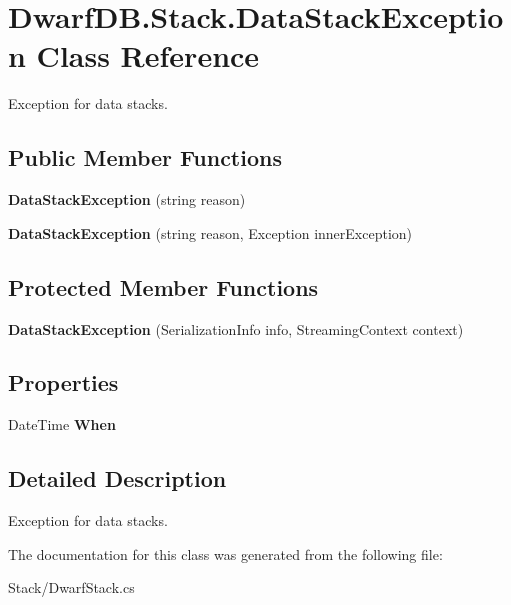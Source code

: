 \hypertarget{class_dwarf_d_b_1_1_stack_1_1_data_stack_exception}{
\section{DwarfDB.Stack.DataStackException Class Reference}
\label{class_dwarf_d_b_1_1_stack_1_1_data_stack_exception}
}


Exception for data stacks.  


\subsection*{Public Member Functions}
\begin{DoxyCompactItemize}
\item 
\hypertarget{class_dwarf_d_b_1_1_stack_1_1_data_stack_exception_a75bf91637eb6790f89577fe4dfb2cd66}{
{\bfseries DataStackException} (string reason)}
\label{class_dwarf_d_b_1_1_stack_1_1_data_stack_exception_a75bf91637eb6790f89577fe4dfb2cd66}

\item 
\hypertarget{class_dwarf_d_b_1_1_stack_1_1_data_stack_exception_af6f022a09792030b2be0c07c87b9fe28}{
{\bfseries DataStackException} (string reason, Exception innerException)}
\label{class_dwarf_d_b_1_1_stack_1_1_data_stack_exception_af6f022a09792030b2be0c07c87b9fe28}

\end{DoxyCompactItemize}
\subsection*{Protected Member Functions}
\begin{DoxyCompactItemize}
\item 
\hypertarget{class_dwarf_d_b_1_1_stack_1_1_data_stack_exception_a456baab589d0eb986f916b47ddd076d2}{
{\bfseries DataStackException} (SerializationInfo info, StreamingContext context)}
\label{class_dwarf_d_b_1_1_stack_1_1_data_stack_exception_a456baab589d0eb986f916b47ddd076d2}

\end{DoxyCompactItemize}
\subsection*{Properties}
\begin{DoxyCompactItemize}
\item 
\hypertarget{class_dwarf_d_b_1_1_stack_1_1_data_stack_exception_ab7fefbe501011036a2cc3d59ccb42cd8}{
DateTime {\bfseries When}}
\label{class_dwarf_d_b_1_1_stack_1_1_data_stack_exception_ab7fefbe501011036a2cc3d59ccb42cd8}

\end{DoxyCompactItemize}


\subsection{Detailed Description}
Exception for data stacks. 

The documentation for this class was generated from the following file:\begin{DoxyCompactItemize}
\item 
Stack/DwarfStack.cs\end{DoxyCompactItemize}
